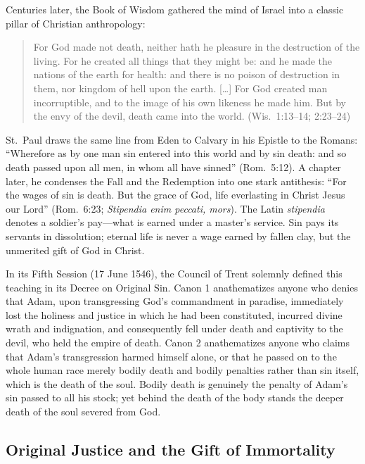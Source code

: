 Centuries later, the Book of Wisdom gathered the mind of Israel into a classic pillar of Christian anthropology:

\begin{quote}
For God made not death, neither hath he pleasure in the destruction of the living. For he created all things that they might be: and he made the nations of the earth for health: and there is no poison of destruction in them, nor kingdom of hell upon the earth. [\ldots] For God created man incorruptible, and to the image of his own likeness he made him. But by the envy of the devil, death came into the world. (Wis.\ 1:13--14; 2:23--24)
\end{quote}

St.~Paul draws the same line from Eden to Calvary in his Epistle to the Romans: ``Wherefore as by one man sin entered into this world and by sin death: and so death passed upon all men, in whom all have sinned'' (Rom.\ 5:12). A chapter later, he condenses the Fall and the Redemption into one stark antithesis: ``For the wages of sin is death. But the grace of God, life everlasting in Christ Jesus our Lord'' (Rom.\ 6:23; \emph{Stipendia enim peccati, mors}). The Latin \emph{stipendia} denotes a soldier's pay---what is earned under a master's service. Sin pays its servants in dissolution; eternal life is never a wage earned by fallen clay, but the unmerited gift of God in Christ.

In its Fifth Session (17 June 1546), the Council of Trent solemnly defined this teaching in its Decree on Original Sin. Canon 1 anathematizes anyone who denies that Adam, upon transgressing God's commandment in paradise, immediately lost the holiness and justice in which he had been constituted, incurred divine wrath and indignation, and consequently fell under death and captivity to the devil, who held the empire of death. Canon 2 anathematizes anyone who claims that Adam's transgression harmed himself alone, or that he passed on to the whole human race merely bodily death and bodily penalties rather than sin itself, which is the death of the soul. Bodily death is genuinely the penalty of Adam's sin passed to all his stock; yet behind the death of the body stands the deeper death of the soul severed from God.

\subsection{Original Justice and the Gift of Immortality}

